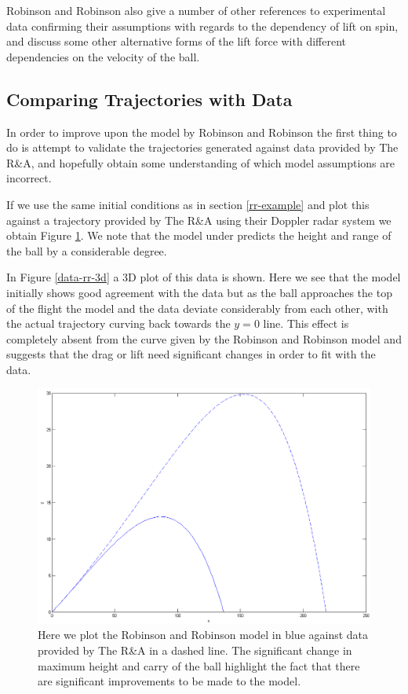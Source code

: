 Robinson and Robinson also give a number of other references to experimental data confirming their
assumptions with regards to the dependency of lift on spin, and discuss some other alternative forms
of the lift force with different dependencies on the velocity of the ball.

\subsection{Comparing Trajectories with Data}

In order to improve upon the model by Robinson and Robinson the first thing to do is attempt to validate
the trajectories generated against data provided by The R\&A, and hopefully obtain some understanding
of which model assumptions are incorrect.

If we use the same initial conditions as in section \ref{rr-example} and plot this against a trajectory
provided by The R\&A using their Doppler radar system we obtain Figure \ref{data-rr-2d}. We note that
the model under predicts the height and range of the ball by a considerable degree.

In Figure \ref{data-rr-3d} a 3D plot of this data is shown. Here we see that the model initially shows
good agreement with the data but as the ball approaches the top of the flight the model and the data
deviate considerably from each other, with the actual trajectory curving back towards the $y=0$ line.
This effect is completely absent from the curve given by the Robinson and Robinson model and suggests
that the drag or lift need significant changes in order to fit with the data.

\begin{figure}
\centering
\includegraphics[scale=0.45]{../images/data1-rr-2d.png}
\caption[Plotting the data against an example Robinson and Robinson trajectory]{Here we plot the Robinson
and Robinson model in blue against data provided by The R\&A in a dashed line. The significant change in maximum height
and carry of the ball highlight the fact that there are significant improvements to be made to the model.}
\label{data-rr-2d}
\end{figure}

